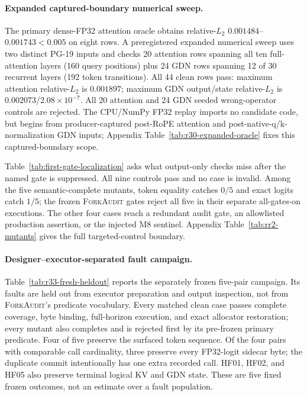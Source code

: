 \documentclass{article}
\newcommand{\method}{\textsc{ForkAudit}}
\begin{document}
\paragraph{Expanded captured-boundary numerical sweep.}
The primary dense-FP32 attention oracle obtains relative-$L_2$
$0.001484$--$0.001743<0.005$ on eight rows.  A preregistered expanded numerical sweep uses
two distinct PG-19 inputs and checks 20 attention rows spanning all ten
full-attention layers (160 query positions) plus 24 GDN rows spanning 12 of 30
recurrent layers (192 token transitions).  All 44 clean rows pass:
maximum attention relative-$L_2$ is $0.001897$; maximum GDN output/state
relative-$L_2$ is $0.002073$/$2.08\times10^{-7}$.  All 20 attention and 24 GDN
seeded wrong-operator controls are rejected.  The CPU/NumPy FP32 replay imports
no candidate code, but begins from producer-captured post-RoPE attention and
post-native-q/k-normalization GDN inputs; Appendix
Table~\ref{tab:r30-expanded-oracle} fixes this captured-boundary scope.



Table~\ref{tab:first-gate-localization} asks what output-only checks miss after
the named gate is suppressed.  All nine controls pass and no case is invalid.
Among the five semantic-complete mutants, token equality catches $0/5$ and
exact logits catch $1/5$; the frozen \method{} gates reject all five in their
separate all-gates-on executions.  The other four cases reach a redundant
audit gate, an allowlisted production assertion, or the injected M8 sentinel.
Appendix Table~\ref{tab:rr2-mutants} gives the full targeted-control boundary.

\paragraph{Designer--executor-separated fault campaign.}
Table~\ref{tab:r33-fresh-heldout} reports the separately frozen five-pair
campaign.  Its faults are held out from executor preparation and output
inspection, not from \method{}'s predicate vocabulary.  Every matched clean
case passes complete coverage, byte binding,
full-horizon execution, and exact allocator restoration; every mutant also
completes and is rejected first by its pre-frozen primary predicate.  Four of
five preserve the surfaced token sequence.  Of the four pairs with comparable
call cardinality, three preserve every FP32-logit sidecar byte; the duplicate
commit intentionally has one extra recorded call.  HF01, HF02, and HF05 also
preserve terminal logical KV and GDN state.  These are five fixed frozen
outcomes, not an estimate over a fault population.
\end{document}
